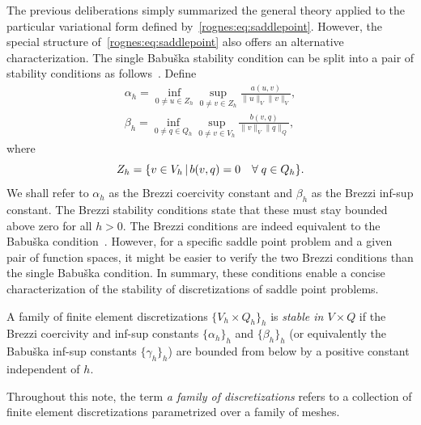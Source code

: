 The previous deliberations simply summarized the general theory
applied to the particular variational form defined
by~\eqref{rognes:eq:saddlepoint}. However, the special structure
of~\eqref{rognes:eq:saddlepoint} also offers an alternative
characterization. The single Babu\v ska stability condition can be split
into a pair of stability conditions as
follows~\cite{Brezzi1974}. Define
\begin{align}
  \label{rognes:eq:brezzi:coercivity}
  \alpha_h =
  \inf_{0 \not = u \in Z_h}
  \sup_{0 \not = v \in Z_h}
  \frac{a(u, v)}{\|u\|_{V} \|v\|_{V}} , \\
  \label{rognes:eq:brezzi:infsup}
  \beta_h =
  \inf_{0 \not = q \in Q_h}
  \sup_{0 \not = v \in V_h}
  \frac{b(v, q)}
       {\|v\|_{V} \|q\|_{Q}},
\end{align}
where
\begin{equation}
  Z_h = \{ v \in V_h \, | \, b(v, q) = 0 \quad \forall \; q \in Q_h\}.
\end{equation}
We shall refer to $\alpha_h$ as the Brezzi coercivity constant and
$\beta_h$ as the Brezzi inf-sup constant. The Brezzi stability
conditions state that these must stay bounded above zero for all $h >
0$. The Brezzi conditions are indeed equivalent to the Babu\v ska
condition~\cite{Brezzi1974}. However, for a specific saddle point
problem and a given pair of function spaces, it might be easier to
verify the two Brezzi conditions than the single Babu\v ska condition.
In summary, these conditions enable a concise characterization of the
stability of discretizations of saddle point problems.
\begin{definition}
  \label{rognes:def:stable}
  A family of finite element discretizations $\{V_h \times Q_h\}_h$ is
  \emph{stable in $V \times Q$} if the Brezzi coercivity and inf-sup
  constants $\{ \alpha_h \}_h $ and $\{ \beta_h \}_h$ (or equivalently
  the Babu\v{s}ka inf-sup constants $\{ \gamma_h \}_h$) are bounded
  from below by a positive constant independent of $h$.
\end{definition}
Throughout this note, the term \emph{a family of discretizations}
refers to a collection of finite element discretizations parametrized
over a family of meshes.

